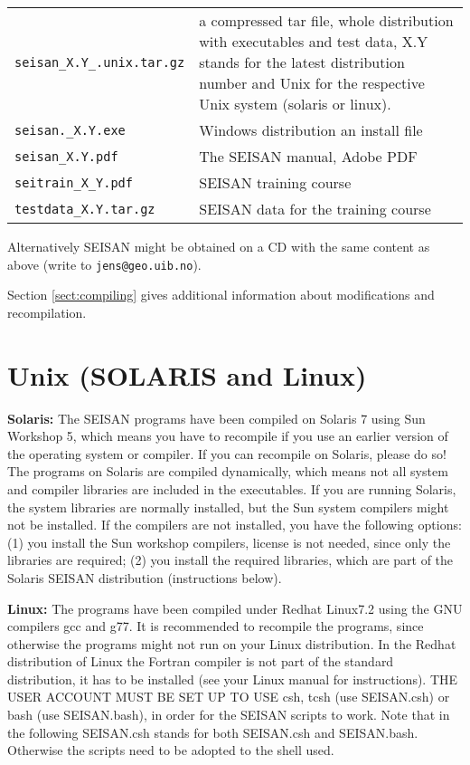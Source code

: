 \begin{tabular}{|lp{10cm}|}
\hline
\texttt{seisan\_X.Y\_.unix.tar.gz} & a compressed tar file, whole 
distribution with executables and test data, X.Y 
stands for the latest distribution number and Unix for the respective Unix 
system (solaris or linux). \\
\texttt{seisan.\_X.Y.exe}  & Windows distribution an install file \\
\texttt{seisan\_X.Y.pdf}  & The SEISAN manual, Adobe PDF \\
\texttt{seitrain\_X\_Y.pdf} & SEISAN training course \\
\texttt{testdata\_X.Y.tar.gz} & SEISAN data for the training course\\
\hline
\end{tabular}
\newline

Alternatively SEISAN might be obtained on a CD with the same content as 
above (write to \newline
\texttt{jens@geo.uib.no}). 

Section \ref{sect:compiling} gives additional information about modifications and recompilation. 

\section{Unix (SOLARIS and Linux)} 
\label{sect:instal-unix}

\textbf{Solaris:} The SEISAN programs have been compiled on Solaris 7 using Sun Workshop 5, which means you have to recompile if you use an earlier version of the operating system or compiler. If you can recompile on Solaris, please do so! The programs on Solaris are compiled dynamically, which means not all system and compiler libraries are included in the executables. If you are running Solaris, the system libraries are normally installed, but the Sun system compilers might not be installed. If the compilers are not installed, you have the following options: (1) you install the Sun workshop compilers, license is not needed, since only the libraries are required; (2) you install the required libraries, which are part of the Solaris SEISAN distribution (instructions below).  

\textbf{Linux:} The programs have been compiled under Redhat Linux7.2 
using the GNU compilers gcc and g77. It is recommended to recompile 
the programs, since otherwise the programs might not run on your 
Linux distribution. In the Redhat distribution of Linux the Fortran 
compiler is not part of the standard distribution, it has to be 
installed (see your Linux manual for instructions). 
THE USER ACCOUNT MUST BE SET UP TO USE csh, tcsh (use SEISAN.csh) or bash (use SEISAN.bash),
in order for the SEISAN scripts to work. 
Note that in the following SEISAN.csh stands for both SEISAN.csh and SEISAN.bash.
Otherwise the scripts need to be adopted to the shell used.


